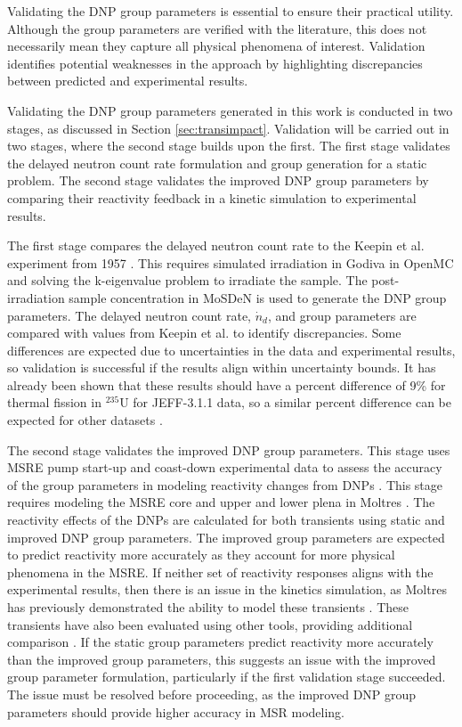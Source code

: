 Validating the \gls{DNP} group parameters is essential to ensure their practical utility.
Although the group parameters are verified with the literature, this does not necessarily mean they capture all physical phenomena of interest.
Validation identifies potential weaknesses in the approach by highlighting discrepancies between predicted and experimental results.

Validating the \gls{DNP} group parameters generated in this work is conducted in two stages, as discussed in Section \ref{sec:transimpact}.
Validation will be carried out in two stages, where the second stage builds upon the first.
The first stage validates the delayed neutron count rate formulation and group generation for a static problem.
The second stage validates the improved \gls{DNP} group parameters by comparing their reactivity feedback in a kinetic simulation to experimental results.

The first stage compares the delayed neutron count rate to the Keepin et al. experiment from 1957 \cite{keepin1957delayed}.
This requires simulated irradiation in Godiva in OpenMC and solving the k-eigenvalue problem to irradiate the sample.
The post-irradiation sample concentration in \gls{MoSDeN} is used to generate the \gls{DNP} group parameters.
The delayed neutron count rate, $\dot{n}_d$, and group parameters are compared with values from Keepin et al. to identify discrepancies.
Some differences are expected due to uncertainties in the data and experimental results, so validation is successful if the results align within uncertainty bounds.
It has already been shown that these results should have a percent difference of 9\% for thermal fission in $^{235}$U for \gls{JEFF}-3.1.1 data, so a similar percent difference can be expected for other datasets \cite{mathieu2012new}.

The second stage validates the improved \gls{DNP} group parameters.
This stage uses \gls{MSRE} pump start-up and coast-down experimental data to assess the accuracy of the group parameters in modeling reactivity changes from \glspl{DNP} \cite{prince1968zero}.
This stage requires modeling the \gls{MSRE} core and upper and lower plena in Moltres \cite{fratoni2020molten}.
The reactivity effects of the \glspl{DNP} are calculated for both transients using static and improved \gls{DNP} group parameters.
The improved group parameters are expected to predict reactivity more accurately as they account for more physical phenomena in the \gls{MSRE}.
If neither set of reactivity responses aligns with the experimental results, then there is an issue in the kinetics simulation, as Moltres has previously demonstrated the ability to model these transients \cite{reynolds2023analysis, park_advancements_2025}.
These transients have also been evaluated using other tools, providing additional comparison \cite{fei2021msre, delpech2003benchmark}.
If the static group parameters predict reactivity more accurately than the improved group parameters, this suggests an issue with the improved group parameter formulation, particularly if the first validation stage succeeded.
The issue must be resolved before proceeding, as the improved \gls{DNP} group parameters should provide higher accuracy in \gls{MSR} modeling.

